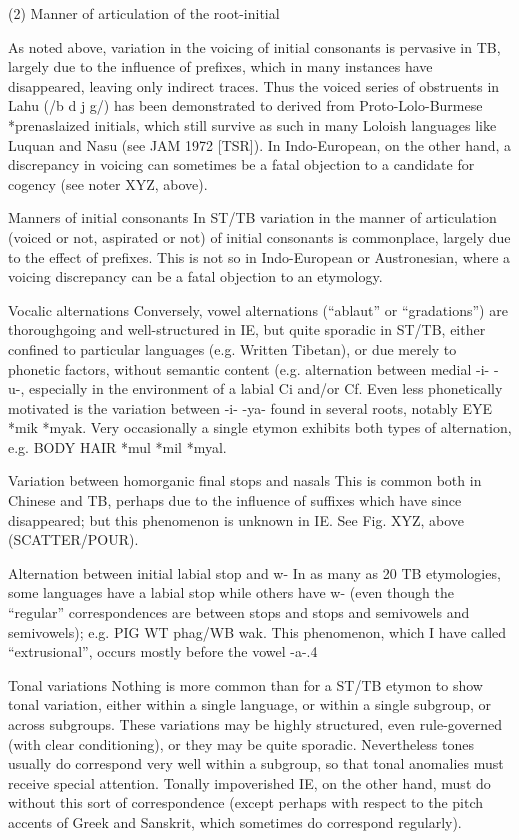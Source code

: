 (2) Manner of articulation of the root-initial

As noted above, variation in the voicing of initial consonants is pervasive in TB, largely due to the influence of prefixes, which in many instances have disappeared, leaving only indirect traces. Thus the voiced series of obstruents in Lahu (/b d j g/) has been demonstrated to derived from Proto-Lolo-Burmese *prenaslaized initials, which still survive as such in many Loloish languages like Luquan and Nasu (see JAM 1972 [TSR]).
In Indo-European, on the other hand, a discrepancy in voicing can sometimes be a fatal objection to a candidate for cogency (see noter XYZ, above).


Manners of initial consonants
In ST/TB variation in the manner of articulation (voiced or not, aspirated or not) of initial consonants is commonplace, largely due to the effect of prefixes. This is not so in Indo-European or Austronesian, where a voicing discrepancy can be a fatal objection to an etymology.

Vocalic alternations
Conversely, vowel alternations (“ablaut” or “gradations”) are thoroughgoing and well-structured in IE, but quite sporadic in ST/TB, either confined to particular languages (e.g. Written Tibetan), or due merely to phonetic factors, without semantic content (e.g. alternation between medial -i-  -u-, especially in the environment of a labial Ci and/or Cf.  Even less phonetically motivated is the variation between -i-  -ya- found in several roots, notably EYE *mik   *myak.  Very occasionally a single etymon exhibits both types of alternation, e.g. BODY HAIR *mul  *mil    *myal.

Variation between homorganic final stops and nasals
This is common both in Chinese and TB, perhaps due to the influence of suffixes which have since disappeared; but this phenomenon is unknown in IE.  See Fig. XYZ, above (SCATTER/POUR).

Alternation between initial labial stop and w-
In as many as 20 TB etymologies, some languages have a labial stop while others have w- (even though the “regular” correspondences are between  stops and stops and semivowels and semivowels); e.g. PIG WT phag/WB wak.  This phenomenon, which I have called “extrusional”, occurs mostly before the vowel -a-.4

Tonal variations
Nothing is more common than for a ST/TB etymon to show tonal variation, either within a single language, or within a single subgroup, or across subgroups.  These variations may be highly structured, even rule-governed (with clear conditioning), or they may be quite sporadic. Nevertheless tones usually do correspond very well within a subgroup, so that tonal anomalies must receive special attention. Tonally impoverished IE, on the other hand, must do without this sort of correspondence (except perhaps with respect to the pitch accents of Greek and Sanskrit, which sometimes do correspond regularly).

